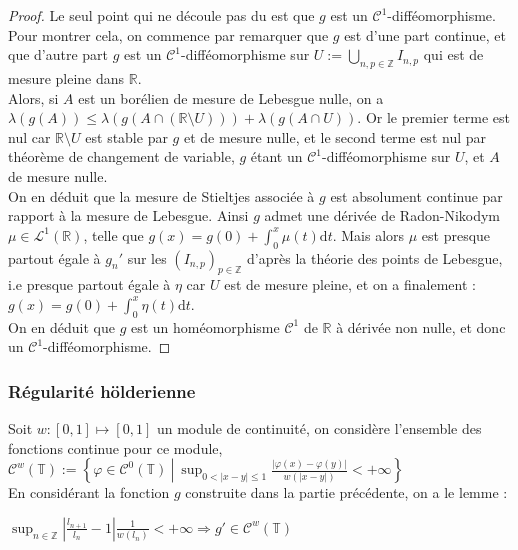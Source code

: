 \documentclass[11pt,a4paper]{article}
\begin{document}
\begin{proof}
Le seul point qui ne découle pas du  est que $g$ est un $\mathcal{C}^1$-difféomorphisme. Pour montrer cela, on commence par remarquer que $g$ est d'une part continue, et que d'autre part $g$ est un $\mathcal{C}^1$-difféomorphisme sur $\displaystyle U := \bigcup_{n,p\in \mathbb{Z}} I_{n,p}$ qui est de mesure pleine dans $\mathbb{R}$. \\
Alors, si $A$ est un borélien de mesure de Lebesgue nulle, on a $\lambda(g(A)) \leq \lambda(g(A\cap (\mathbb{R} \setminus U))) + \lambda(g(A\cap U))$. 
Or le premier terme est nul car $\mathbb{R} \setminus U$ est stable par $g$ et de mesure nulle, et le second terme est nul par théorème de changement de variable, $g$ étant un $\mathcal{C}^1$-difféomorphisme sur $ U $, et $A$ de mesure nulle. \\

On en déduit que la mesure de Stieltjes associée à $g$ est absolument continue par rapport à la mesure de Lebesgue. Ainsi $g$ admet une dérivée de Radon-Nikodym $\mu \in \mathcal{L}^1(\mathbb{R})$, telle que $g(x) = g(0) + \displaystyle \int_0^x \mu(t) \mathrm{d}t$. Mais alors $\mu$ est presque partout égale à $g_n'$ sur les $(I_{n,p})_{p\in \mathbb{Z}}$ d'après la théorie des points de Lebesgue, i.e presque partout égale à $\eta$ car $U$ est de mesure pleine, et on a finalement : $g(x) = g(0) + \displaystyle \int_0^x \eta(t) \mathrm{d}t$. \\
On en déduit que $g$ est un homéomorphisme $\mathcal{C}^1$ de $\mathbb{R}$ à dérivée non nulle, et donc un $\mathcal{C}^1$-difféomorphisme. 
\end{proof}

\subsubsection{Régularité hölderienne}

Soit $w:[0, 1] \mapsto [0, 1]$ un module de continuité, on considère l'ensemble des fonctions continue pour ce module, $\displaystyle\mathcal{C}^w(\mathbb{T}) := \left\{ \varphi \in \mathcal{C}^0(\mathbb{T}) \ \left| \ \sup_{ 0<|x-y|\leq 1}  \frac{|\varphi(x)-\varphi(y)|}{w(|x-y|)} < +\infty \right. \right\} $ \\

En considérant la fonction $g$ construite dans la partie précédente, on a le lemme :

\begin{lemma}\label{reg_holder}
$ \displaystyle \sup_{n\in \mathbb{Z}} \left |\frac{l_{n+1}}{l_n}-1 \right |\frac{1}{w(l_n)} <+ \infty \Rightarrow g' \in \mathcal{C}^w(\mathbb{T})$
\end{lemma}
\end{document}
